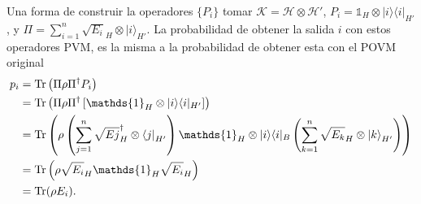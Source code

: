 Una forma de construir la operadores $\{P_i\}$ tomar
$\mathcal{K}=\mathcal{H}\otimes\mathcal{H'}$, $P _{i}=\mathds{1} _{H}\otimes
|i\rangle \langle i|_{H'}$, y
$\Pi=\sum _{i=1}^{n}{\sqrt {E_{i}} }_{H}\otimes {|i\rangle }_{H'}$. La
probabilidad de obtener la salida $i$ con estos operadores PVM, es la misma a
la probabilidad de obtener esta con el POVM original {\cite{2007geometry}}
\begin{equation}
 \begin{split}
 p_i&=\tr \left(\Pi\rho\Pi^{\dagger }P _{i}\right)\\
 &=\tr \left(\Pi\rho \Pi^{\dagger }\left[\mathds{1}_{H}\otimes |i\rangle \langle i|_{H'}\right]\right)\\
 &=\tr \left(\rho\left(\sum _{j=1}^{n}{\sqrt {E{j} }}_{H}^{\dagger }\otimes {\langle j|}_{H'}\right)\mathds{1} _{H}\otimes |i\rangle \langle i|_{B}\left(\sum _{k=1}^{n}{\sqrt {E_{k} }}_{H}\otimes {|k\rangle }_{H'}\right)\right)\\
 &=\tr \left(\rho {\sqrt {E_{i} }}_{H}\mathds{1} _{H}{\sqrt {E_{i} }}_{H}\right)\\
 &=\tr (\rho E_{i}).
 \end{split}
\end{equation}



